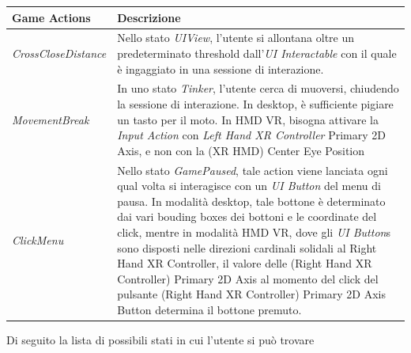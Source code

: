 \documentclass[10pt, openany]{article}
\begin{document}
    \begin{table}[h]
      \centering
      \begin{tabular}{@{} p{} p{} @{}}
        \toprule
        \textbf{Game Actions} & \textbf{Descrizione} \\
        \midrule
        \textit{CrossCloseDistance} & Nello stato \textit{UIView}, l'utente si allontana oltre un predeterminato threshold dall'\textit{UI Interactable} con il quale \`e
          ingaggiato in una sessione di interazione. \\
        \textit{MovementBreak} & In uno stato \textit{Tinker}, l'utente cerca di muoversi, chiudendo la sessione di interazione. In desktop, \`e sufficiente 
          pigiare un tasto per il moto. In HMD VR, bisogna attivare la \textit{Input Action} con \textit{Left Hand XR Controller} Primary 2D Axis, e non con 
          la (XR HMD) Center Eye Position \\
        \textit{ClickMenu} & Nello stato \textit{GamePaused}, tale action viene lanciata ogni qual volta si interagisce con un \textit{UI Button} del menu di pausa. In modalit\`a
          desktop, tale bottone \`e determinato dai vari bouding boxes dei bottoni e le coordinate del click, mentre in modalit\`a HMD VR, dove gli \textit{UI Button}s sono
          disposti nelle direzioni cardinali solidali al Right Hand XR Controller, il valore delle (Right Hand XR Controller) Primary 2D Axis al momento del click del pulsante
          (Right Hand XR Controller) Primary 2D Axis Button determina il bottone premuto. \\
        \bottomrule
      \end{tabular}
    \end{table}
    Di seguito la lista di possibili stati in cui l'utente si pu\`o trovare
\end{document}
